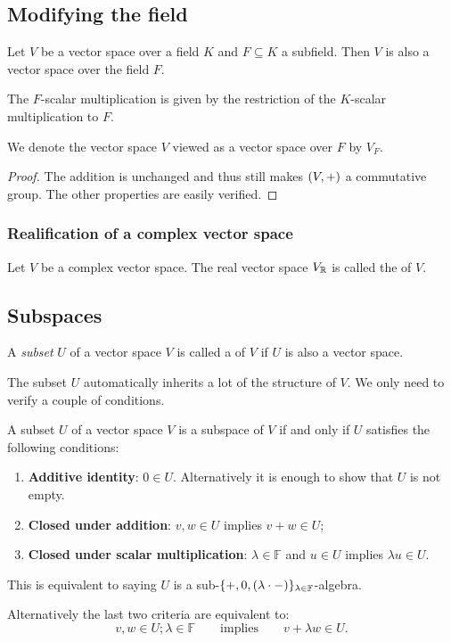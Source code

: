 \subsection{Modifying the field}
\begin{proposition} \label{subfieldVectorSpace}
Let $V$ be a vector space over a field $K$ and $F\subseteq K$ a subfield. Then $V$ is also a vector space over the field $F$. 
\end{proposition}
The $F$-scalar multiplication is given by the restriction of the $K$-scalar multiplication to $F$.

We denote the vector space $V$ viewed as a vector space over $F$ by $V_F$.
\begin{proof}
The addition is unchanged and thus still makes $\sSet{V,+}$ a commutative group. The other properties are easily verified.
\end{proof}

\subsubsection{Realification of a complex vector space}
\begin{definition}
Let $V$ be a complex vector space. The real vector space $V_{\mathbb{R}}$ is called the  of $V$.
\end{definition}

\subsection{Subspaces}
\begin{definition}
A \textit{subset} $U$ of a vector space $V$ is called a  of $V$ if $U$ is also a vector space.
\end{definition}
The subset $U$ automatically inherits a lot of the structure of $V$. We only need to verify a couple of conditions.
\begin{proposition} \label{subspaceCriterion}
A subset $U$ of a vector space $V$ is a subspace of $V$ \textup{if and only if} $U$ satisfies the following conditions:
\begin{enumerate}
\item \textbf{Additive identity}: $0 \in U$. Alternatively it is enough to show that $U$ is not empty.
\item \textbf{Closed under addition}: $v,w \in U$ implies $v+w\in U$;
\item \textbf{Closed under scalar multiplication}: $\lambda \in \mathbb{F}$ and $u\in U$ implies $\lambda u \in U$.
\end{enumerate}
This is equivalent to saying $U$ is a sub-$\{+,0, (\lambda\cdot -)\}_{\lambda\in\mathbb{F}}$-algebra.
\end{proposition}
Alternatively the last two criteria are equivalent to:
\[ v,w\in U; \lambda \in \mathbb{F} \qquad \text{implies} \qquad v+\lambda w \in U. \]

